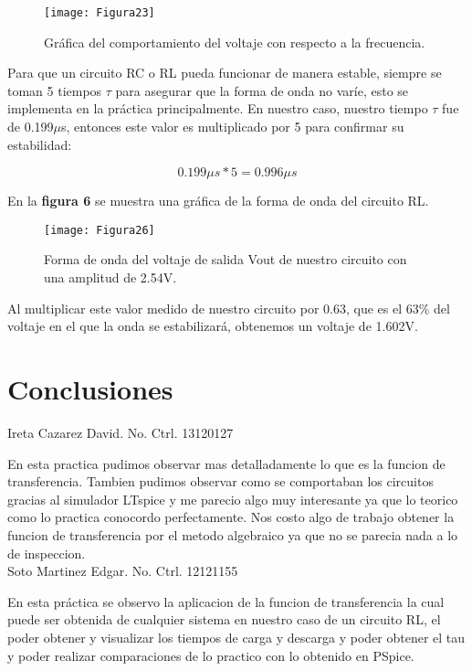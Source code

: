 \documentclass{report}
\newcounter{ns}
\begin{document}
	\newpage
	
	
	\begin{figure}[H]
		\centering
		\texttt{[image: Figura23]}
		\caption{ Gráfica del comportamiento del voltaje con respecto a la frecuencia.}
		\label{fig:figura100}
	\end{figure}
	
	Para que un circuito RC o RL pueda funcionar de manera estable, siempre se toman 5 tiempos $ \tau $ para asegurar que la forma de onda no varíe, esto se implementa en la práctica principalmente. En nuestro caso, nuestro tiempo $ \tau $ fue de 0.199$ \mu $s, entonces este valor es multiplicado por 5 para confirmar su estabilidad:
	
	\begin{equation}
	0.199{\mu}s*5=0.996{\mu}s
	\end{equation}
	
	En la \textbf{figura 6} se muestra una gráfica de la forma de onda del circuito RL.
	
	\begin{figure}[H]
		\centering
		\texttt{[image: Figura26]}
		\caption{Forma de onda del voltaje de salida Vout de nuestro circuito con una amplitud de 2.54V.}
		\label{fig:figura100}
	\end{figure}
	
	Al multiplicar este valor medido de nuestro circuito por 0.63, que es el 63\% del voltaje en el que la onda se estabilizará, obtenemos un voltaje de 1.602V.
	
	\newpage
	\section*{Conclusiones}
	
	Ireta Cazarez David. No. Ctrl. 13120127
	
	En esta practica pudimos observar mas detalladamente lo que es la funcion de transferencia. Tambien pudimos observar como se comportaban los circuitos gracias al simulador LTspice y me parecio algo muy interesante ya que lo teorico como lo practica conocordo perfectamente. Nos costo algo de trabajo obtener la funcion de transferencia por el metodo algebraico ya que no se parecia nada a lo de inspeccion.\\
	
	Soto Martinez Edgar. No. Ctrl. 12121155
	
	En esta práctica se observo la aplicacion de la funcion de transferencia la cual puede ser obtenida de cualquier sistema en nuestro caso de un circuito RL, el poder obtener y visualizar los tiempos de carga y descarga y poder obtener el tau y poder realizar comparaciones de lo practico con lo obtenido en PSpice.	
\end{document}
